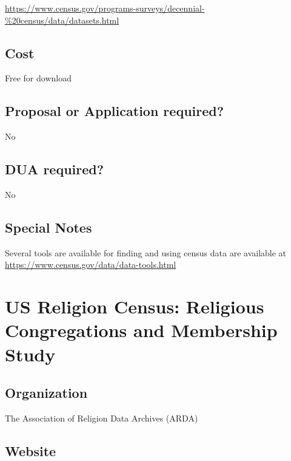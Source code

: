 \documentclass[
]{book}
\begin{document}
\url{https://www.census.gov/programs-surveys/decennial-\%20census/data/datasets.html}

\hypertarget{cost-93}{%
\section{Cost}\label{cost-93}}

Free for download

\hypertarget{proposal-or-application-required-93}{%
\section{Proposal or Application required?}\label{proposal-or-application-required-93}}

No

\hypertarget{dua-required-93}{%
\section{DUA required?}\label{dua-required-93}}

No

\hypertarget{special-notes-93}{%
\section{Special Notes}\label{special-notes-93}}

Several tools are available for finding and using census data are available at \url{https://www.census.gov/data/data-tools.html}

\mainmatter

\hypertarget{us-religion-census-religious-congregations-and-membership-study}{%
\chapter{US Religion Census: Religious Congregations and Membership Study}\label{us-religion-census-religious-congregations-and-membership-study}}

\hypertarget{organization-94}{%
\section{Organization}\label{organization-94}}

The Association of Religion Data Archives (ARDA)

\hypertarget{website-94}{%
\section{Website}\label{website-94}}
\end{document}
